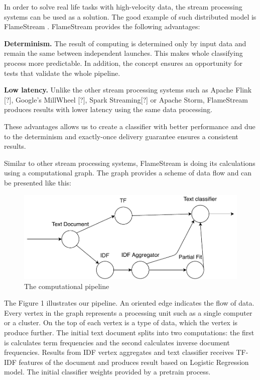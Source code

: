 

In order to solve real life tasks with high-velocity data, the stream processing systems can be used as a solution. The good example of such distributed model is FlameStream \cite{Kuralenok:2018}. FlameStream provides the following advantages:

\textbf{Determinism.} The result of computing is determined only by input data and remain the same between independent launches. This makes whole classifying process more predictable. In addition, the concept ensures an opportunity for tests that validate the whole pipeline.

\textbf{Low latency.} Unlike the other stream processing systems such as Apache Flink [?], Google's MillWheel [?], Spark Streaming[?] or Apache Storm, FlameStream produces results with lower latency using the same data processing.

These advantages allows us to create a classifier with better performance and due to the determinism and exactly-once delivery guarantee ensures a consistent results.

Similar to other stream processing systems, FlameStream is doing its calculations using a computational graph. The graph provides a scheme of data flow and can be presented like this:

\begin{figure}[htbp]
  \centering
  \includegraphics[scale=0.5]{pics/tf-idf-graph}
  \caption{The computational pipeline}
  \label {TF-IDF Graph}
\end{figure}

The Figure 1 illustrates our pipeline. An oriented edge indicates the flow of data. Every vertex in the graph represents a processing unit such as a single computer or a cluster. On the top of each vertex is a type of data, which the vertex is produce further. The initial text document splits into two computations: the first is calculates term frequencies and the second calculates inverse document frequencies. Results from IDF vertex aggregates and text classifier receives TF-IDF features of the document and produces result based on Logistic Regression model. The initial classifier weights provided by a pretrain process.

